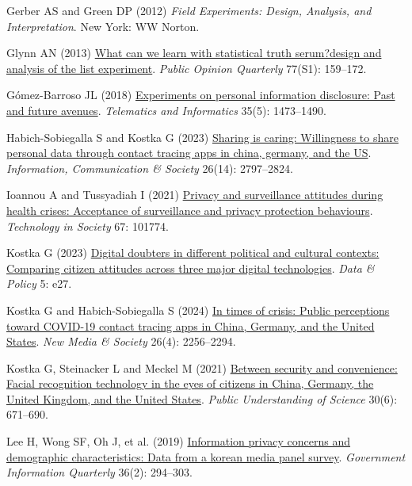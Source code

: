 \documentclass[
  letterpaper,
  DIV=11,
  numbers=noendperiod]{scrartcl}
\newlength{\cslhangindent}
\newenvironment{CSLReferences}[2] %
 {\begin{list}{}{%
  \setlength{\itemindent}{0pt}
  \setlength{\leftmargin}{0pt}
  \setlength{\parsep}{0pt}
  \ifodd #1
   \setlength{\leftmargin}{\cslhangindent}
   \setlength{\itemindent}{-1\cslhangindent}
  \fi
  \setlength{\itemsep}{#2\baselineskip}}}
 {\end{list}}
\begin{document}
\begin{CSLReferences}{1}{1}
Gerber AS and Green DP (2012) \emph{Field Experiments: Design, Analysis,
and Interpretation}. New York: WW Norton.

Glynn AN (2013) \href{https://doi.org/10.1093/poq/nfs070}{What can we
learn with statistical truth serum?design and analysis of the list
experiment}. \emph{Public Opinion Quarterly} 77(S1): 159--172.

Gómez-Barroso JL (2018)
\href{https://doi.org/10.1016/j.tele.2018.03.017}{Experiments on
personal information disclosure: Past and future avenues}.
\emph{Telematics and Informatics} 35(5): 1473--1490.

Habich-Sobiegalla S and Kostka G (2023)
\href{https://doi.org/10.1080/1369118X.2022.2113421}{Sharing is caring:
Willingness to share personal data through contact tracing apps in
china, germany, and the US}. \emph{Information, Communication \&
Society} 26(14): 2797--2824.

Ioannou A and Tussyadiah I (2021)
\href{https://doi.org/10.1016/j.techsoc.2021.101774}{Privacy and
surveillance attitudes during health crises: Acceptance of surveillance
and privacy protection behaviours}. \emph{Technology in Society} 67:
101774.

Kostka G (2023) \href{https://doi.org/10.1017/dap.2023.25}{Digital
doubters in different political and cultural contexts: Comparing citizen
attitudes across three major digital technologies}. \emph{Data \&
Policy} 5: e27.

Kostka G and Habich-Sobiegalla S (2024)
\href{https://doi.org/10.1177/14614448221083285}{In times of crisis:
Public perceptions toward COVID-19 contact tracing apps in China,
Germany, and the United States}. \emph{New Media \& Society} 26(4):
2256--2294.

Kostka G, Steinacker L and Meckel M (2021)
\href{https://doi.org/10.1177/09636625211001555}{Between security and
convenience: Facial recognition technology in the eyes of citizens in
China, Germany, the United Kingdom, and the United States}. \emph{Public
Understanding of Science} 30(6): 671--690.

Lee H, Wong SF, Oh J, et al. (2019)
\href{https://doi.org/10.1016/j.giq.2019.01.002}{Information privacy
concerns and demographic characteristics: Data from a korean media panel
survey}. \emph{Government Information Quarterly} 36(2): 294--303.


\end{CSLReferences}
\end{document}
